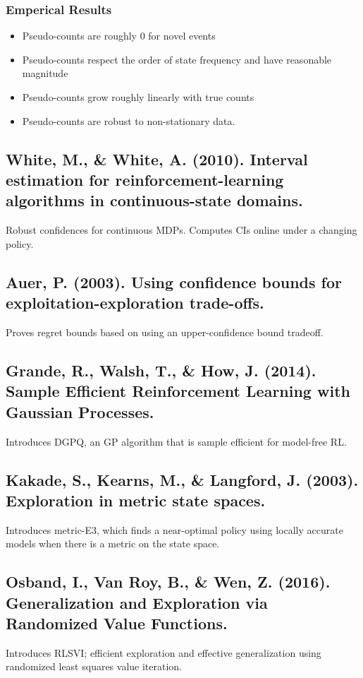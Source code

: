 \documentclass[12pt, oneside]{amsart}
\begin{document}
	\subsubsection*{Emperical Results} 
	\begin{itemize}
		\item Pseudo-counts are roughly 0 for novel events
		\item Pseudo-counts respect the order of state frequency and have reasonable magnitude
		\item Pseudo-counts grow roughly linearly with true counts
		\item Pseudo-counts are robust to non-stationary data.
	\end{itemize}
	
	\subsection*{White, M., \& White, A. (2010). Interval estimation for reinforcement-learning algorithms in continuous-state domains.}
	Robust confidences for continuous MDPs. Computes CIs online under a changing policy.
	\subsection*{Auer, P. (2003). Using confidence bounds for exploitation-exploration trade-offs.}
	
	Proves regret bounds based on using an upper-confidence bound tradeoff.
	
	\subsection*{Grande, R., Walsh, T., \& How, J. (2014). Sample Efficient Reinforcement Learning with Gaussian Processes.}
	Introduces DGPQ, an GP algorithm that is sample efficient for model-free  RL.
	
	\subsection*{Kakade, S., Kearns, M., \& Langford, J. (2003). Exploration in metric state spaces.}
	Introduces metric-E3, which finds a near-optimal policy using locally accurate models when there is a metric on the state space.
	
	\subsection*{Osband, I., Van Roy, B., \& Wen, Z. (2016). Generalization and Exploration via Randomized Value Functions.}
	Introduces RLSVI; efficient exploration and effective generalization using randomized least squares value iteration.
	
\end{document}
